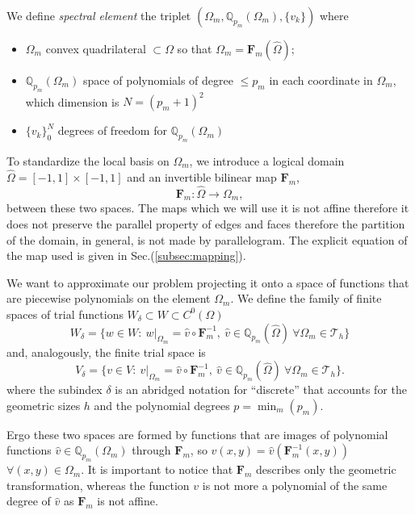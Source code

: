 We define \textit{spectral element} the triplet $(\Omega_m, \mathbb{Q}_{p_m}(\Omega_m),\{v_k\})$ where
\begin{itemize}
  \item $\Omega_m$ convex quadrilateral $\subset \Omega$ so that $\Omega_m=\textbf{F}_m(\hat{\Omega})$;
  \item $\mathbb{Q}_{p_m}(\Omega_m)$ space of polynomials of degree $\leq p_m$ in each coordinate in $\Omega_m$, which dimension is $N=(p_m+1)^2$
  \item $\{v_k\}_0^N$ degrees of freedom for $\mathbb{Q}_{p_m}(\Omega_m)$
\end{itemize}

To standardize the local basis on $\Omega_m$, we introduce a logical domain $\hat{\Omega}=[-1,1]\times[-1,1]$ and an invertible bilinear map $\textbf{F}_m$,
\begin{equation}
\textbf{F}_m:\hat{\Omega} \rightarrow \Omega_m,
\end{equation}
between these two spaces. The maps which we will use it is not affine therefore it does not preserve the parallel property of edges and faces therefore the partition of the domain, in general, is not made by parallelogram. The explicit equation of the map used is given in Sec.(\ref{subsec:mapping}).
\medskip

We want to approximate our problem projecting it onto a space of functions that are piecewise polynomials on the element $\Omega_m$. We define the family of finite spaces of trial functions $W_\delta\subset W\subset C^0(\Omega)$
\begin{equation}
  W_\delta=\{w\in W:\: w|_{\Omega_m}=\hat{v}\circ \mathbf{F}^{-1}_m,\:\hat{v}\in\mathbb{Q}_{p_m}(\hat{\Omega})\:\forall\Omega_m\in\mathcal{T}_h\}
\end{equation}
and, analogously, the finite trial space is
\begin{equation}
 V_\delta=\{v\in V:\: v|_{\Omega_m}=\hat{v}\circ \mathbf{F}^{-1}_m,\:\hat{v}\in\mathbb{Q}_{p_m}(\hat{\Omega})\:\forall\Omega_m\in\mathcal{T}_h\}.
\end{equation}
where the subindex $\delta$ is an abridged notation for \textquotedblleft{discrete\textquotedblright} that accounts for the geometric sizes $h$ and the polynomial degrees $p=\min_m(p_m)$.

Ergo these two spaces are formed by functions that are images of polynomial functions $\hat{v}\in\mathbb{Q}_{p_m}(\Omega_m)$ through $\mathbf{F}_m$, so $v(x,y)=\hat{v}(\mathbf{F}_m^{-1}(x,y))$ $\forall(x,y)\in\Omega_m$. It is important to notice that $\mathbf{F}_m$ describes only the geometric transformation, whereas the function $v$ is not more a polynomial of the same degree of $\hat{v}$ as $\mathbf{F}_m$ is not affine.

